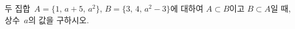 두 집합~$A=\{1,\,a+5,\,a^2\}$, $B=\{3,\,4,\,a^2-3\}$에 대하여 $A\subset B$이고 $B\subset A$일 때, 상수~$a$의 값을 구하시오.
